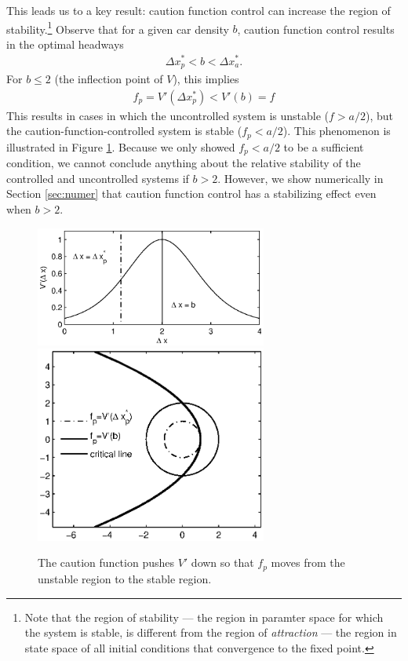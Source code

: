 \documentclass[10pt,twocolumn]{article}
\begin{document}
This leads us to a key result: caution function control can increase the region of stability.\footnote{Note that the region of stability --- the region in paramter space for which the system is stable, is different from the region of {\em attraction} --- the region in state space of all initial conditions that convergence to the fixed point.} Observe that for a given car density $b$, caution function control results in the optimal headways 
\begin{gather}
\Delta x_p^* < b < \Delta x_a^*.
\end{gather}
For $b \leq 2$ (the inflection point of $V$), this implies
\begin{gather}
f_p = V'(\Delta x_p^*) < V'(b) = f
\end{gather}
This results in cases in which the uncontrolled system is unstable ($f > a/2$), but the caution-function-controlled system is stable ($f_p < a/2$). This phenomenon is illustrated in Figure \ref{fig:ctrstbl}. Because we only showed $f_p < a/2$ to be a sufficient condition, we cannot conclude anything about the relative stability of the controlled and uncontrolled systems if $b>2$. However, we show numerically in Section \ref{sec:numer} that caution function control has a stabilizing effect even when $b>2$. 

\begin{figure}[!h]
\begin{center}
\includegraphics[width=3in]{vopt_caution}
\includegraphics[width=3in]{ctrstbl}
\end{center}
\caption{ \label{fig:ctrstbl} The caution function pushes $V'$ down so that $f_p$ moves from the unstable region to the stable region.}
\end{figure}
\end{document}
